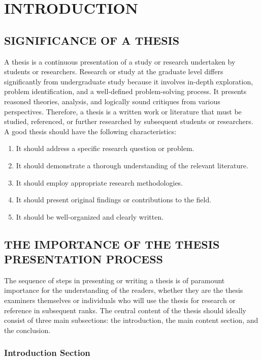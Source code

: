 \chapter{INTRODUCTION}

\section{SIGNIFICANCE OF A THESIS}

A thesis is a continuous presentation of a study or research undertaken by
students or researchers. Research or study at the graduate level differs significantly
from undergraduate study because it involves in-depth exploration, problem
identification, and a well-defined problem-solving process. It presents reasoned
theories, analysis, and logically sound critiques from various perspectives. Therefore, a
thesis is a written work or literature that must be studied, referenced, or further
researched by subsequent students or researchers. A good thesis should have the following characteristics:
\begin{enumerate}[label=\arabic*.]
    \item It should address a specific research question or problem.
    \item It should demonstrate a thorough understanding of the relevant literature.
    \item It should employ appropriate research methodologies.
    \item It should present original findings or contributions to the field.
    \item It should be well-organized and clearly written.
\end{enumerate}

\section{THE IMPORTANCE OF THE THESIS PRESENTATION PROCESS}

The sequence of steps in presenting or writing a thesis is of paramount
importance for the understanding of the readers, whether they are the thesis
examiners themselves or individuals who will use the thesis for research or reference
in subsequent ranks. The central content of the thesis should ideally consist of three
main subsections: the introduction, the main content section, and the conclusion.

\subsection{Introduction Section}

